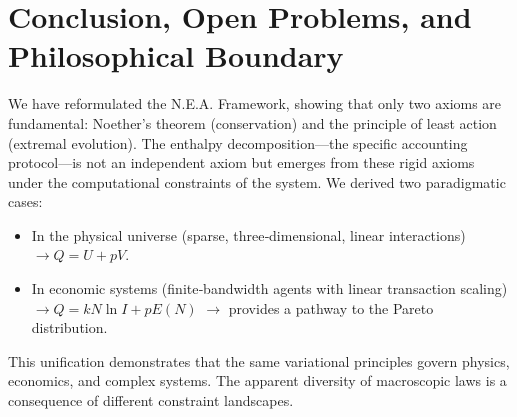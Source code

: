 \documentclass{article}
\begin{document}
\section{Conclusion, Open Problems, and Philosophical Boundary}
We have reformulated the N.E.A. Framework, showing that only two axioms are fundamental: Noether’s theorem (conservation) and the principle of least action (extremal evolution). The enthalpy decomposition—the specific accounting protocol—is not an independent axiom but emerges from these rigid axioms under the computational constraints of the system. We derived two paradigmatic cases:
\begin{itemize}
    \item In the physical universe (sparse, three‑dimensional, linear interactions) $\to Q = U + pV$.
    \item In economic systems (finite‑bandwidth agents with linear transaction scaling) $\to Q = k N \ln I + p E(N)$ $\to$ provides a pathway to the Pareto distribution.
\end{itemize}
This unification demonstrates that the same variational principles govern physics, economics, and complex systems. The apparent diversity of macroscopic laws is a consequence of different constraint landscapes.
\end{document}
